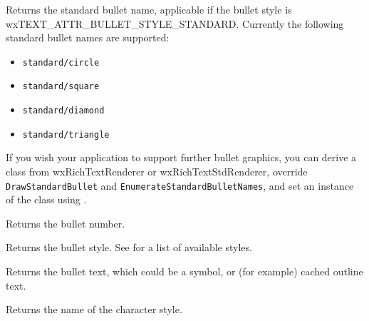 \label{wxtextattrexgetbulletname}


Returns the standard bullet name, applicable if the bullet style is wxTEXT\_ATTR\_BULLET\_STYLE\_STANDARD.
Currently the following standard bullet names are supported:

\begin{itemize}\itemsep=0pt
\item {\tt standard/circle}
\item {\tt standard/square}
\item {\tt standard/diamond}
\item {\tt standard/triangle}
\end{itemize}

If you wish your application to support further bullet graphics, you can derive a
class from wxRichTextRenderer or wxRichTextStdRenderer, override {\tt DrawStandardBullet} and {\tt EnumerateStandardBulletNames}, and
set an instance of the class using .

\label{wxtextattrexgetbulletnumber}


Returns the bullet number.

\label{wxtextattrexgetbulletstyle}


Returns the bullet style.
See  for a list of available styles.

\label{wxtextattrexgetbullettext}


Returns the bullet text, which could be a symbol, or (for example) cached outline text.

\label{wxtextattrexgetcharacterstylename}


Returns the name of the character style.

\label{wxtextattrexgetlinespacing}


